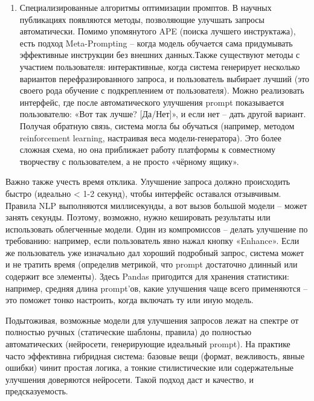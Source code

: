 \begin{enumerate}[label=\arabic*.]
\item Специализированные алгоритмы оптимизации промптов. В научных публикациях появляются методы, позволяющие улучшать запросы автоматически. Помимо упомянутого APE (поиска лучшего инструктажа), есть подход Meta-Prompting – когда модель обучается сама придумывать эффективные инструкции без внешних данных.Также существуют методы с участием пользователя: интерактивные, когда система генерирует несколько вариантов перефразированного запроса, и пользователь выбирает лучший (это своего рода обучение с подкреплением от пользователя). Можно реализовать интерфейс, где после автоматического улучшения prompt показывается пользователю: «Вот так лучше? [Да/Нет]», и если нет – дать другой вариант. Получая обратную связь, система могла бы обучаться (например, методом reinforcement learning, настраивая веса модели-генератора). Это более сложная схема, но она приближает работу платформы к совместному творчеству с пользователем, а не просто «чёрному ящику».

\end{enumerate}

Важно также учесть время отклика. Улучшение запроса должно происходить быстро (идеально < 1-2 секунд), чтобы интерфейс оставался отзывчивым. Правила NLP выполняются миллисекунды, а вот вызов большой модели – может занять секунды. Поэтому, возможно, нужно кешировать результаты или использовать облегченные модели. Один из компромиссов – делать улучшение по требованию: например, если пользователь явно нажал кнопку «Enhance». Если же пользователь уже изначально дал хороший подробный запрос, система может и не тратить время (определив метрикой, что prompt достаточно длинный или содержит все элементы). Здесь Pandas пригодится для хранения статистики: например, средняя длина prompt’ов, какие улучшения чаще всего применяются – это поможет тонко настроить, когда включать ту или иную модель.

Подытоживая, возможные модели для улучшения запросов лежат на спектре от полностью ручных (статические шаблоны, правила) до полностью автоматических (нейросети, генерирующие идеальный prompt). На практике часто эффективна гибридная система: базовые вещи (формат, вежливость, явные ошибки) чинит простая логика, а тонкие стилистические или содержательные улучшения доверяются нейросети. Такой подход даст и качество, и предсказуемость.


